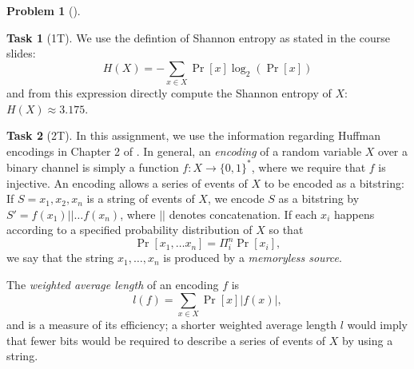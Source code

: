\documentclass[11pt,twoside]{article}
\theoremstyle{definition}
\newtheorem{amsproblem}{Problem}
\newtheorem{amssubproblem}{Task}[amsproblem]
\newenvironment{problem}[1][]{%
  \begin{amsproblem}[#1]
  }{%
  \end{amsproblem}
}
\newenvironment{subproblem}[1][]{%
  \begin{amssubproblem}[#1]
  }{%
  \end{amssubproblem}
}
\newcommand{\TP}[1]{#1T}
\begin{document}
\begin{problem}
  \begin{subproblem}[\TP{1}]
    We use the defintion of Shannon entropy as stated in the course slides:
    \[
      H(X) = -\sum_{x\in X}\Pr[x]\log_2(\Pr[x])
    \]
    and from this expression directly compute the Shannon entropy of $X$: $H(X) \approx 3.175$. %
  \end{subproblem}
  \begin{subproblem}[\TP{2}]
    In this assignment, we use the information regarding Huffman encodings in Chapter 2 of \cite{stinsonCryptographyTheoryPractice2006}. In general, an \emph{encoding} of a random variable $X$ over a binary channel is simply a function $f: X \to \{0, 1\}^*$, where we require that $f$ is injective. An encoding allows a series of events of $X$ to be encoded as a bitstring: If $S = x_1, x_2, x_n$ is a string of events of $X$, we encode $S$ as a bitstring by $S' = f(x_1) || \ldots f(x_n)$, where $||$ denotes concatenation. If each $x_i$ happens according to a specified probability distribution of $X$ so that
    \[
      \Pr[x_1,\ldots x_n] = \Pi_i^n \Pr[x_i],
    \]
    we say that the string $x_1, \ldots, x_n$ is produced by a \emph{memoryless source}.

    The \emph{weighted average length} of an encoding $f$ is
    \[
      l(f) = \sum_{x\in X}\Pr[x] \lvert f(x) \rvert,
    \]
    and is a measure of its efficiency; a shorter weighted average length $l$ would imply that fewer bits would be required to describe a series of events of $X$ by using a string.


\end{subproblem}
\end{problem}
\end{document}
